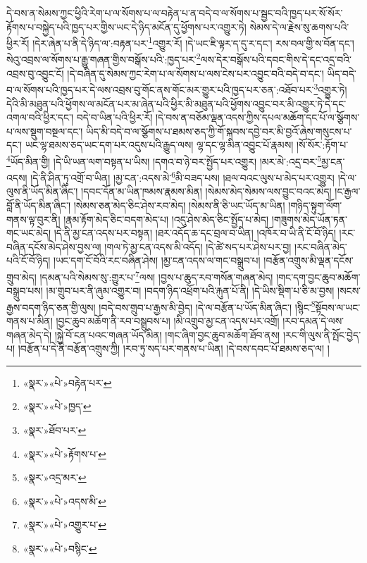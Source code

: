 དེ་བས་ན་སེམས་ཀྱང་ཕྱིའི་རེག་པ་ལ་སོགས་པ་ལ་བརྟེན་པ་ན་བདེ་བ་ལ་སོགས་པ་སྦྱང་བའི་ཁྱད་པར་སོ་སོར་རྟོགས་པ་བསྐྱེད་པའི་ཁྱད་པར་གྱིས་ཡང་དེ་ཉིད་མངོན་དུ་ཕྱོགས་པར་འགྱུར་ཏེ། སེམས་དེ་ལ་རྗེས་སུ་ཆགས་པའི་ཕྱིར་རོ། །དེར་ཞེན་པ་ནི་དེ་ཉིད་ལ་:བརྟན་པར་\footnote{«སྣར་»«པེ་»བརྟེན་པར་}འགྱུར་རོ། །དེ་ཡང་ཇི་ལྟར་ད་དུ་ར་དང་། རས་བལ་གྱི་ས་བོན་དང་། སེའུ་འབྲས་ལ་སོགས་པ་རྒྱུ་གཞན་གྱིས་བསྒོས་པའི་:ཁྱད་པར་\footnote{«སྣར་»«པེ་»ཁྱད་}ལས་དེར་བསྒོས་པའི་དབང་གིས་དེ་དང་འདྲ་བའི་འབྲས་བུ་འབྱུང་ངོ། །དེ་བཞིན་དུ་སེམས་ཀྱང་རེག་པ་ལ་སོགས་པ་ལས་ངེས་པར་འབྱུང་བའི་བདེ་བ་དང་། ཡིད་བདེ་བ་ལ་སོགས་པའི་ཁྱད་པར་དེ་ལས་འབྲས་བུ་གོང་ནས་གོང་མར་གྱུར་པའི་ཁྱད་པར་ཅན་:འཐོབ་པར་\footnote{«སྣར་»ཐོབ་པར་}འགྱུར་ཏེ། དེའི་མི་མཐུན་པའི་ཕྱོགས་ལ་མངོན་པར་མ་ཞེན་པའི་ཕྱིར་མི་མཐུན་པའི་ཕྱོགས་འབྱུང་བར་མི་འགྱུར་ཏེ་དེ་དང་འགལ་བའི་ཕྱིར་དང་། བདེ་བ་ཡིན་པའི་ཕྱིར་རོ། །དེ་བས་ན་བཅོམ་ལྡན་འདས་ཀྱིས་དཔལ་མཆོག་དང་པོ་ལ་སྩོགས་པ་ལས་སྡུག་བསྔལ་དང་། ཡིད་མི་བདེ་བ་ལ་སྩོགས་པ་ཐམས་ཅད་ཀྱི་གོ་སྐབས་དབྱེ་བར་མི་བྱའོ་ཞེས་གསུངས་པ་དང་། ཡང་ལྷ་ཐམས་ཅད་ཡང་དག་པར་འདུས་པའི་རྒྱུད་ལས། ལྷ་དང་ལྷ་མིན་འབྱུང་པོ་རྣམས། །སོ་སོར་:རྟོག་པ་\footnote{«སྣར་»«པེ་»རྟོགས་པ་}ཡོད་མིན་གྱི། །དེ་ཡི་ཡན་ལག་བསྟན་པ་ཡིས། །དགའ་བ་ཉེ་བར་སྤྱོད་པར་འགྱུར། །མར་མེ་:འདྲ་བར་\footnote{«སྣར་»འདྲ་མར་}མྱ་ངན་འདས། །དེ་ནི་ཤིན་ཏུ་འགྲོ་བ་ཡིན། །མྱ་ངན་:འདས་མེ་\footnote{«སྣར་»«པེ་»འདས་མི་}མི་བཟད་པས། །ཐལ་བའང་ལུས་པ་མེད་པར་འགྱུར། །དེ་ལ་ལུས་ནི་ཡོད་མིན་ཞིང་། །དབང་དོན་མ་ཡིན་ཁམས་རྣམས་མིན། །སེམས་མེད་སེམས་ལས་བྱུང་བའང་མེད། །ང་རྒྱལ་བློ་ནི་ཡོད་མིན་ཞིང་། །སེམས་ཅན་མེད་ཅིང་ཤེས་རབ་མེད། །སེམས་ནི་ཅི་ཡང་ཡོད་མ་ཡིན། །གཉིད་སྟུག་ལོག་གནས་ལྟ་བུར་ནི། །རྣམ་རྟོག་མེད་ཅིང་བདག་མེད་པ། །འདུ་ཤེས་མེད་ཅིང་སྤྱོད་པ་མེད། །གཟུགས་མེད་ཡོན་ཏན་གང་ཡང་མེད། །དེ་ནི་མྱ་ངན་འདས་པར་བསྟན། །ཐར་འདོད་ཆ་དང་བྲལ་བ་ཡིན། །འཁོར་བ་ཡི་ནི་ངོ་བོ་ཉིད། །རང་བཞིན་དངོས་མེད་ཤེས་བྱས་ལ། །གལ་ཏེ་མྱ་ངན་འདས་མི་འདོད། །དེ་ཚེ་སད་པར་ཤེས་པར་བྱ། །རང་བཞིན་མེད་པའི་ངོ་བོ་ཉིད། །ཡང་དག་ངོ་བོའི་རང་བཞིན་ཤེས། །མྱ་ངན་འདས་ལ་གང་བསྒྲུབ་པ། །བརྩོན་འགྲུས་མི་ལྡན་དངོས་གྲུབ་མེད། །དམན་པའི་སེམས་སུ་:གྱུར་པ་\footnote{«སྣར་»«པེ་»འགྱུར་པ་}ལས། །བྱས་པ་ཆུད་རབ་གསོན་གཞན་མེད། །གང་དག་བྱང་ཆུབ་མཆོག་བསྒྲུབ་པས། །མ་གྲུབ་པར་ནི་ཞུམ་འགྱུར་བ། །བདག་ཉིད་འཕྲོག་པའི་རྐུན་པོ་ནི། །དེ་ཡིས་སྡིག་པ་ཅི་མ་བྱས། །སངས་རྒྱས་བདག་ཉིད་ཅན་གྱི་ལུས། །བདེ་བས་གྲུབ་པ་རྒྱས་མི་བྱེད། །དེ་ལ་བརྩོན་པ་ཡོད་མིན་ཞིང་། །སྙིང་\footnote{«སྣར་»«པེ་»བསྙིང་}སྟོབས་ལ་ཡང་གནས་པ་མིན། །བྱང་ཆུབ་མཆོག་ནི་རབ་བསྒྲུབས་པ། །མི་འགྲུབ་མྱ་ངན་འདས་པར་འགྲོ། །རབ་དམན་དེ་ལས་གཞན་མེད་དེ། །སྐྱེ་བོ་ངན་པའང་གཞན་ཡོད་མིན། །གང་ཞིག་བྱང་ཆུབ་མཆོག་ཐོབ་ནས། །རང་གི་ལུས་ནི་སྤོང་བྱེད་པ། །བརྩོན་པ་དེ་ནི་བརྩོན་འགྲུས་ཀྱི། །རབ་ཏུ་སད་པར་གནས་པ་ཡིན། །དེ་བས་དབང་པོ་ཐམས་ཅད་ལ། །
